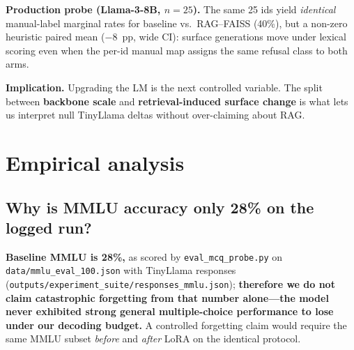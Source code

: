 \documentclass[11pt,a4paper]{article}
\begin{document}
\vspace{0.45em}
\begin{sloppypar}
\noindent\textbf{Production probe (Llama-3-8B, $n{=}25$).}\quad
The same 25 ids yield \emph{identical} manual-label marginal rates for baseline vs.\ RAG--FAISS (40\%), but a non-zero heuristic paired mean ($-8$~pp, wide CI): surface generations move under lexical scoring even when the per-id manual map assigns the same refusal class to both arms.
\end{sloppypar}

\vspace{0.45em}
\begin{sloppypar}
\noindent\textbf{Implication.}\quad
Upgrading the LM is the next controlled variable.
The split between \textbf{backbone scale} and \textbf{retrieval-induced surface change} is what lets us interpret null TinyLlama deltas without over-claiming about RAG.
\end{sloppypar}

\section[Empirical analysis]{Empirical analysis}
\label{sec:analysis}

\subsection{Why is MMLU accuracy only 28\% on the logged run?}

\textbf{Baseline MMLU is 28\%,} as scored by \texttt{eval\_mcq\_probe.py} on \texttt{data/mmlu\_eval\_100.json} with TinyLlama responses (\texttt{outputs/experiment\_suite/responses\_mmlu.json}); \textbf{therefore we do not claim catastrophic forgetting from that number alone---the model never exhibited strong general multiple-choice performance to lose under our decoding budget.}
A controlled forgetting claim would require the same MMLU subset \emph{before} and \emph{after} LoRA on the identical protocol.
\end{document}
